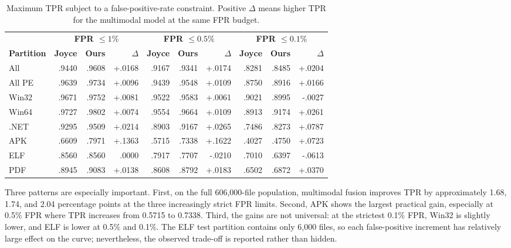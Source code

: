 \documentclass[conference]{IEEEtran}
\begin{document}
\begin{table}[t]
\centering
\caption{Maximum TPR subject to a false-positive-rate constraint. Positive $\Delta$ means higher TPR for the multimodal model at the same FPR budget.}
\label{tab:lowfpr}
\scriptsize
\setlength{\tabcolsep}{3.4pt}
\renewcommand{\arraystretch}{1.08}
\begin{tabular}{lrrr|rrr|rrr}
\toprule
& \multicolumn{3}{c}{\textbf{FPR $\leq1\%$}} & \multicolumn{3}{c}{\textbf{FPR $\leq0.5\%$}} & \multicolumn{3}{c}{\textbf{FPR $\leq0.1\%$}} \\
\textbf{Partition} & \textbf{Joyce} & \textbf{Ours} & \boldmath$\Delta$ & \textbf{Joyce} & \textbf{Ours} & \boldmath$\Delta$ & \textbf{Joyce} & \textbf{Ours} & \boldmath$\Delta$ \\
\midrule
All & .9440 & .9608 & +.0168 & .9167 & .9341 & +.0174 & .8281 & .8485 & +.0204 \\
All PE & .9639 & .9734 & +.0096 & .9439 & .9548 & +.0109 & .8750 & .8916 & +.0166 \\
Win32 & .9671 & .9752 & +.0081 & .9522 & .9583 & +.0061 & .9021 & .8995 & -.0027 \\
Win64 & .9727 & .9802 & +.0074 & .9554 & .9664 & +.0109 & .8913 & .9174 & +.0261 \\
.NET & .9295 & .9509 & +.0214 & .8903 & .9167 & +.0265 & .7486 & .8273 & +.0787 \\
APK & .6609 & .7971 & +.1363 & .5715 & .7338 & +.1622 & .4027 & .4750 & +.0723 \\
ELF & .8560 & .8560 & .0000 & .7917 & .7707 & -.0210 & .7010 & .6397 & -.0613 \\
PDF & .8945 & .9083 & +.0138 & .8608 & .8792 & +.0183 & .6502 & .6872 & +.0370 \\
\bottomrule
\end{tabular}
\end{table}

Three patterns are especially important. First, on the full 606,000-file population, multimodal fusion improves TPR by approximately 1.68, 1.74, and 2.04 percentage points at the three increasingly strict FPR limits. Second, APK shows the largest practical gain, especially at 0.5\% FPR where TPR increases from 0.5715 to 0.7338. Third, the gains are not universal: at the strictest 0.1\% FPR, Win32 is slightly lower, and ELF is lower at 0.5\% and 0.1\%. The ELF test partition contains only 6,000 files, so each false-positive increment has relatively large effect on the curve; nevertheless, the observed trade-off is reported rather than hidden.
\end{document}
